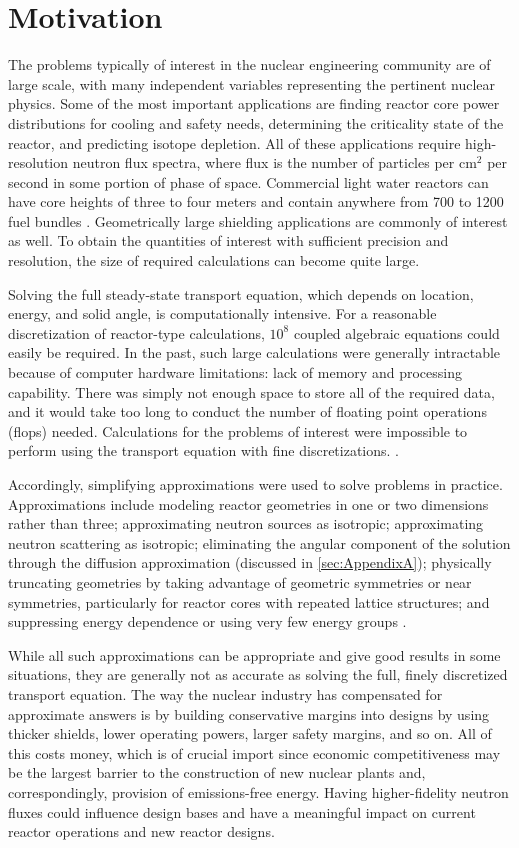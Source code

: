 \section{Motivation}
The problems typically of interest in the nuclear engineering community are of large scale, with many independent variables representing the pertinent nuclear physics. Some of the most important applications are finding reactor core power distributions for cooling and safety needs, determining the criticality state of the reactor, and predicting isotope depletion. All of these applications require high-resolution neutron flux spectra, where flux is the number of particles per cm$^{2}$ per second in some portion of phase of space. Commercial light water reactors can have core heights of three to four meters and contain anywhere from 700 to 1200 fuel bundles \cite{Fennern2006}. Geometrically large shielding applications are commonly of interest as well. To obtain the quantities of interest with sufficient precision and resolution, the size of required calculations can become quite large. 

Solving the full steady-state transport equation, which depends on location, energy, and solid angle, is computationally intensive. For a reasonable discretization of reactor-type calculations, $10^{8}$ coupled algebraic equations could easily be required. In the past, such large calculations were generally intractable because of computer hardware limitations: lack of memory and processing capability. There was simply not enough space to store all of the required data, and it would take too long to conduct the number of floating point operations (flops) needed. Calculations for the problems of interest were impossible to perform using the transport equation with fine discretizations. \cite{Duderstadt1976}. 

Accordingly, simplifying approximations were used to solve problems in practice. Approximations include modeling reactor geometries in one or two dimensions rather than three; approximating neutron sources as isotropic; approximating neutron scattering as isotropic; eliminating the angular component of the solution through the diffusion approximation (discussed in \ref{sec:AppendixA}); physically truncating geometries by taking advantage of geometric symmetries or near symmetries, particularly for reactor cores with repeated lattice structures; and suppressing energy dependence or using very few energy groups \cite{Duderstadt1976}.

While all such approximations can be appropriate and give good results in some situations, they are generally not as accurate as solving the full, finely discretized transport equation. The way the nuclear industry has compensated for approximate answers is by building conservative margins into designs by using thicker shields, lower operating powers, larger safety margins, and so on. All of this costs money, which is of crucial import since economic competitiveness may be the largest barrier to the construction of new nuclear plants and, correspondingly, provision of emissions-free energy. Having higher-fidelity neutron fluxes could influence design bases and have a meaningful impact on current reactor operations and new reactor designs. 

